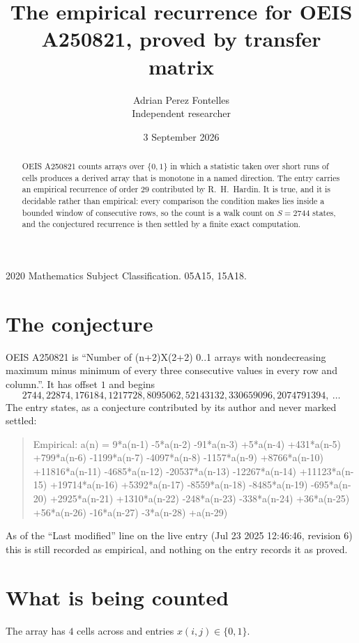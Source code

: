 \documentclass[11pt,a4paper]{article}
\title{The empirical recurrence for OEIS A250821, proved by transfer matrix}
\author{Adrian Perez Fontelles\\ \small Independent researcher}
\date{3 September 2026}
\theoremstyle{plain}
\theoremstyle{definition}
\begin{document}
\maketitle

\begin{abstract}
OEIS A250821 counts arrays over $\{0,1\}$ in which a statistic taken over short runs
of cells produces a derived array that is monotone in a named direction. The entry carries an
empirical recurrence of order $29$ contributed by R.~H.~Hardin. It is true, and it is
decidable rather than empirical: every comparison the condition makes lies inside a bounded
window of consecutive rows, so the count is a walk count on $S=2744$ states, and the
conjectured recurrence is then settled by a finite exact computation.
\end{abstract}

\noindent\small 2020 Mathematics Subject Classification. 05A15, 15A18.\normalsize

\section{The conjecture}

OEIS A250821 is ``Number of (n+2)X(2+2) 0..1 arrays with nondecreasing maximum minus minimum of every three consecutive values in every row and column.''. It has offset $1$ and begins
\[
2744, 22874, 176184, 1217728, 8095062, 52143132, 330659096, 2074791394,\ \dots
\]
The entry states, as a conjecture contributed by its author and never marked settled:
\begin{quote}
Empirical: a(n) = 9*a(n-1) -5*a(n-2) -91*a(n-3) +5*a(n-4) +431*a(n-5) +799*a(n-6) -1199*a(n-7) -4097*a(n-8) -1157*a(n-9) +8766*a(n-10) +11816*a(n-11) -4685*a(n-12) -20537*a(n-13) -12267*a(n-14) +11123*a(n-15) +19714*a(n-16) +5392*a(n-17) -8559*a(n-18) -8485*a(n-19) -695*a(n-20) +2925*a(n-21) +1310*a(n-22) -248*a(n-23) -338*a(n-24) +36*a(n-25) +56*a(n-26) -16*a(n-27) -3*a(n-28) +a(n-29)
\end{quote}
As of the ``Last modified'' line on the live entry (Jul 23 2025 12:46:46, revision 6) this is still
recorded as empirical, and nothing on the entry records it as proved.

\section{What is being counted}

The array has $4$ cells across and entries $x(i,j)\in\{0,1\}$.
\end{document}

